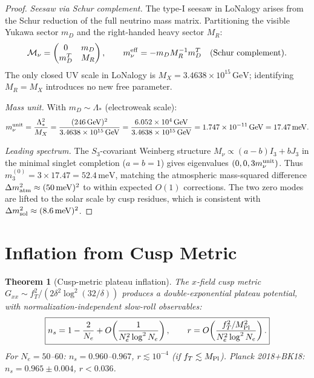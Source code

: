 \documentclass[12pt]{article}
\theoremstyle{plain}
\newtheorem{theorem}{Theorem}[section]
\theoremstyle{definition}
\numberwithin{equation}{section}
\begin{document}
\begin{proof}
\emph{Seesaw via Schur complement.}
The type-I seesaw in LoNalogy arises from the Schur reduction of the full neutrino mass matrix.
Partitioning the visible Yukawa sector $m_D$ and the right-handed heavy sector $M_R$:
\[
\mathcal{M}_\nu = \begin{pmatrix} 0 & m_D \\ m_D^T & M_R \end{pmatrix},
\qquad
m_\nu^{\rm eff} = -m_D M_R^{-1} m_D^T \quad (\text{Schur complement}).
\]
The only closed UV scale in LoNalogy is $M_X=3.4638\times10^{15}\,\mathrm{GeV}$; identifying $M_R=M_X$ introduces no new free parameter.

\emph{Mass unit.}
With $m_D\sim\Lambda_*$ (electroweak scale):
\[
m_\nu^{\rm unit} = \frac{\Lambda_*^2}{M_X} = \frac{(246\,\mathrm{GeV})^2}{3.4638\times10^{15}\,\mathrm{GeV}}
= \frac{6.052\times10^4\,\mathrm{GeV}}{3.4638\times10^{15}\,\mathrm{GeV}}
= 1.747\times10^{-11}\,\mathrm{GeV} = 17.47\,\mathrm{meV}.
\]

\emph{Leading spectrum.}
The $S_3$-covariant Weinberg structure $M_\nu\propto(a-b)I_3+bJ_3$ in the minimal singlet completion ($a=b=1$) gives eigenvalues $(0,0,3m_\nu^{\rm unit})$.
Thus $m_3^{(0)}=3\times17.47=52.4\,\mathrm{meV}$, matching the atmospheric mass-squared difference $\Delta m_{\rm atm}^2\approx(50\,\mathrm{meV})^2$ to within expected $O(1)$ corrections.
The two zero modes are lifted to the solar scale by cusp residues, which is consistent with $\Delta m_{\rm sol}^2\approx(8.6\,\mathrm{meV})^2$.
\end{proof}

\section{Inflation from Cusp Metric}\label{sec:inflation}

\begin{theorem}[Cusp-metric plateau inflation]\label{thm:inflation}
The $x$-field cusp metric $G_{xx}\sim f_T^2/(2\delta^2\log^2(32/\delta))$ produces a double-exponential plateau potential, with normalization-independent slow-roll observables:
\[
\boxed{n_s=1-\frac{2}{N_e}+O\!\left(\frac{1}{N_e^2\log^2N_e}\right),\qquad
r=O\!\left(\frac{f_T^2/M_{\rm Pl}^2}{N_e^2\log^2N_e}\right).}
\]
For $N_e=50$--$60$: $n_s=0.960$--$0.967$, $r\lesssim10^{-4}$ (if $f_T\lesssim M_{\rm Pl}$).
Planck 2018+BK18: $n_s=0.965\pm0.004$, $r<0.036$.
\end{theorem}
\end{document}
